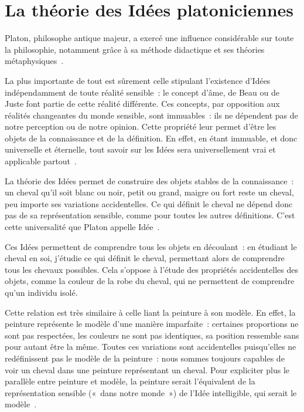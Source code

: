 \documentclass[a4paper, titlepage, 12pt]{article}
\begin{document}
	\newpage
	\section{La théorie des Idées platoniciennes}
	Platon, philosophe antique majeur, a exercé une influence considérable sur toute la philosophie, notamment grâce à sa méthode didactique et ses théories métaphysiques~\cite{Platon2025}.

	La plus importante de tout est sûrement celle stipulant l'existence d'Idées indépendamment de toute réalité sensible~: le concept d'âme, de Beau ou de Juste font partie de cette réalité différente. Ces concepts, par opposition aux réalités changeantes du monde sensible, sont immuables~: ils ne dépendent pas de notre perception ou de notre opinion. Cette propriété leur permet d'être les objets de la connaissance et de la définition. En effet, en étant immuable, et donc universelle et éternelle, tout savoir sur les Idées sera universellement vrai et applicable partout~\cite{platonTheetete2016}.

	La théorie des Idées permet de construire des objets stables de la connaissance~: un cheval qu'il soit blanc ou noir, petit ou grand, maigre ou fort reste un cheval, peu importe ses variations accidentelles. Ce qui définit le cheval ne dépend donc pas de sa représentation sensible, comme pour toutes les autres définitions. C'est cette universalité que Platon appelle Idée~\cite{platonTheetete2016}.

	Ces Idées permettent de comprendre tous les objets en découlant~: en étudiant le cheval en soi, j'étudie ce qui définit le cheval, permettant alors de comprendre tous les chevaux possibles. Cela s'oppose à l'étude des propriétés accidentelles des objets, comme la couleur de la robe du cheval, qui ne permettent de comprendre qu'un individu isolé.

	Cette relation est très similaire à celle liant la peinture à son modèle. En effet, la peinture représente le modèle d'une manière imparfaite~: certaines proportions ne sont pas respectées, les couleurs ne sont pas identiques, sa position ressemble sans pour autant être la même. Toutes ces variations sont accidentelles puisqu'elles ne redéfinissent pas le modèle de la peinture~: nous sommes toujours capables de voir un cheval dans une peinture représentant un cheval. Pour expliciter plus le parallèle entre peinture et modèle, la peinture serait l'équivalent de la représentation sensible («~dans notre monde~») de l'Idée intelligible, qui serait le modèle~\cite{platonSophiste2022}.
\end{document}
